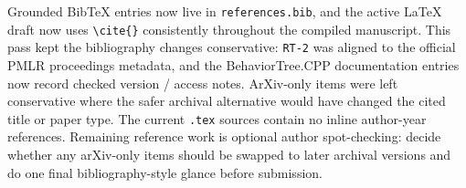 Grounded BibTeX entries now live in \texttt{references.bib}, and the active
LaTeX draft now uses \texttt{\textbackslash cite\{\}} consistently throughout
the compiled manuscript. This pass kept the bibliography changes conservative:
\texttt{RT-2} was aligned to the official PMLR proceedings metadata, and the
BehaviorTree.CPP documentation entries now record checked version / access
notes. ArXiv-only items were left conservative where the safer archival
alternative would have changed the cited title or paper type. The current
\texttt{.tex} sources contain no inline author-year references. Remaining
reference work is optional author spot-checking: decide whether any arXiv-only
items should be swapped to later archival versions and do one final
bibliography-style glance before submission.
